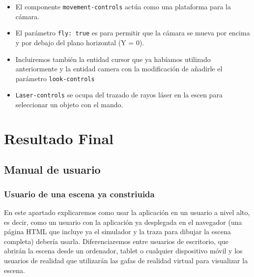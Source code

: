 \documentclass[a4paper, 12pt]{book}
\begin{document}
\begin{itemize}
    \item El componente \texttt{movement-controls} actúa como una plataforma para la cámara. 
    
    \item El parámetro \texttt{fly: true} es para permitir que la cámara se mueva por encima y por debajo del plano horizontal (Y = 0).
    
    \item Incluiremos también la entidad cursor que ya habíamos utilizado anteriormente y la entidad camera con la modificación de añadirle el parámetro \texttt{look-controls}
    
    \item \texttt{Laser-controls} se ocupa del trazado de rayos láser en la escen para seleccionar un objeto con el mando.
    
\end{itemize}



\cleardoublepage
\chapter{Resultado Final}
\section{Manual de usuario}
\subsection{Usuario de una escena ya constriuida}

En este apartado explicaremos como usar la aplicación en un usuario a nivel alto, es decir, como un usuario con la aplicación ya desplegada en el navegador (una página HTML que incluye ya el simulador y la traza para dibujar la escena completa) debería usarla.
Diferenciaremos entre usuarios de escritorio, que abrirán la escena desde un ordenador, tablet o cualquier dispositivo móvil y los usuarios de realidad que utilizarán las gafas de realidad virtual para visualizar la escena.
\end{document}
